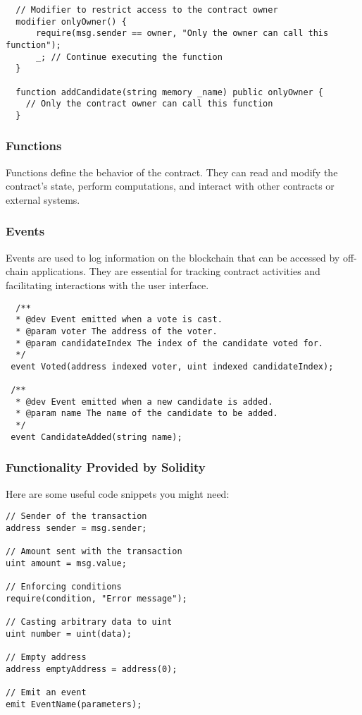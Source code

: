 \documentclass[12pt]{article}
\begin{document}
\begin{verbatim}
  // Modifier to restrict access to the contract owner
  modifier onlyOwner() {
      require(msg.sender == owner, "Only the owner can call this function");
      _; // Continue executing the function
  }

  function addCandidate(string memory _name) public onlyOwner {
    // Only the contract owner can call this function
  }
\end{verbatim}

\subsubsection*{Functions}

Functions define the behavior of the contract. They can read and modify the contract's state, perform computations, and interact with other contracts or external systems.

\subsubsection*{Events}

Events are used to log information on the blockchain that can be accessed by off-chain applications. They are essential for tracking contract activities and facilitating interactions with the user interface.

\begin{verbatim}
  /**
  * @dev Event emitted when a vote is cast.
  * @param voter The address of the voter.
  * @param candidateIndex The index of the candidate voted for.
  */
 event Voted(address indexed voter, uint indexed candidateIndex);

 /**
  * @dev Event emitted when a new candidate is added.
  * @param name The name of the candidate to be added.
  */
 event CandidateAdded(string name);
\end{verbatim}

\subsubsection*{Functionality Provided by Solidity}
Here are some useful code snippets you might need:

\begin{verbatim}
// Sender of the transaction
address sender = msg.sender;

// Amount sent with the transaction
uint amount = msg.value;

// Enforcing conditions
require(condition, "Error message");

// Casting arbitrary data to uint
uint number = uint(data);

// Empty address
address emptyAddress = address(0);

// Emit an event
emit EventName(parameters);
\end{verbatim}
\end{document}
